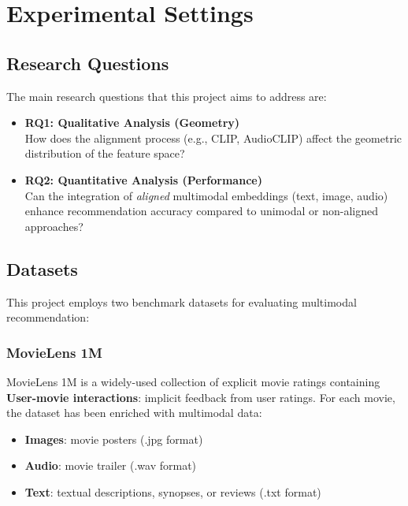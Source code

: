 \section{Experimental Settings}

\subsection{Research Questions}
The main research questions that this project aims to address are:
\begin{itemize}
   
      \item \textbf{RQ1: Qualitative Analysis (Geometry)}\\
    How does the alignment process (e.g., CLIP, AudioCLIP) affect the geometric distribution of the feature space?

    \item \textbf{RQ2: Quantitative Analysis (Performance)}\\
        Can the integration of \textit{aligned} multimodal embeddings (text, image, audio) enhance recommendation accuracy compared to unimodal or non-aligned approaches?
\end{itemize}

\subsection{Datasets}

This project employs two benchmark datasets for evaluating multimodal recommendation:

\subsubsection{MovieLens 1M}

MovieLens 1M is a widely-used collection of explicit movie ratings containing \textbf{User-movie interactions}: implicit feedback from user ratings.
For each movie, the dataset has been enriched with multimodal data:
\begin{itemize}
    \item \textbf{Images}: movie posters (.jpg format)
    \item \textbf{Audio}: movie trailer (.wav format)
    \item \textbf{Text}: textual descriptions, synopses, or reviews (.txt format)
\end{itemize}

